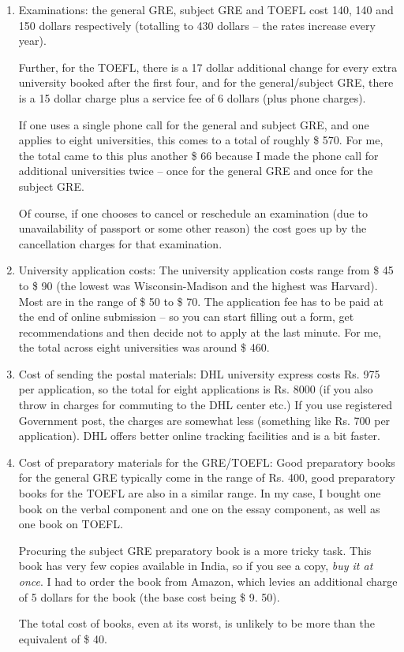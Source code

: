 \documentclass[a4paper]{amsart}
\begin{document}
\begin{enumerate}

\item Examinations: the general GRE, subject GRE and TOEFL cost 140,
  140 and 150 dollars respectively (totalling to 430 dollars -- the rates
  increase every year).

  Further, for the TOEFL, there is a 17 dollar additional change for
  every extra university booked after the first four, and for the
  general/subject GRE, there is a 15 dollar charge plus a service fee
  of 6 dollars (plus phone charges).

  If one uses a single phone call for the general and subject GRE,
  and one applies to eight universities, this comes to a total of roughly
  \$ 570. For me, the total came to this plus another \$ 66
  because I made the phone call for additional universities twice -- once
  for the general GRE and once for the subject GRE.

  Of course, if one chooses to cancel or reschedule an examination
  (due to unavailability of passport or some other reason) the cost
  goes up by the cancellation charges for that examination.

\item University application costs: The university application costs
  range from \$ 45 to \$ 90 (the lowest was Wisconsin-Madison and the
  highest was Harvard). Most are in the range of \$ 50 to \$ 70. The
  application fee has to be paid at the end of online submission -- so
  you can start filling out a form, get recommendations and then decide
  not to apply at the last minute. For me, the total across eight
  universities was around \$ 460.

\item Cost of sending the postal materials: DHL university express
  costs Rs. 975 per application, so the total for eight applications
  is Rs. 8000 (if you also throw in charges for commuting to the DHL
  center etc.) If you use registered Government post, the charges are
  somewhat less (something like Rs. 700 per application). DHL offers
  better online tracking facilities and is a bit faster.

\item Cost of preparatory materials for the GRE/TOEFL: Good preparatory
  books for the general GRE typically come in the range of Rs. 400,
  good preparatory books for the TOEFL are also in a similar range.
  In my case, I bought one book on the verbal component and one on the
  essay component, as well as one book on TOEFL.

  Procuring the subject GRE preparatory book is a more tricky task.
  This book has very few copies available in India, so if you see a copy,
  {\em buy it at once}. I had to order the book from Amazon,
  which levies an additional charge of 5 dollars for the book
  (the base cost being \$ 9. 50).

  The total cost of books, even at its worst, is unlikely to be more than 
  the equivalent of \$ 40.
\end{enumerate}
\end{document}
